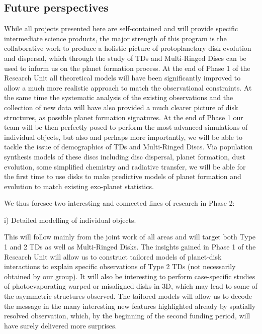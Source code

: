 \documentclass[10pt,fleqn,twoside,a4paper]{article}
\begin{document}
\subsection{Future perspectives}
%
While all projects presented here are self-contained and will
provide specific intermediate science products, the major strength of this program is the collaborative
work to produce a holistic picture of protoplanetary disk evolution
and dispersal, which through the study of TDs and Multi-Ringed Discs can be used
to inform us on the planet formation process. At the end of Phase 1 of
the Research Unit all theoretical models will have been significantly
improved to allow a much more realistic approach to match the
observational constraints. At the same time the systematic analysis of
the existing observations and the collection of new data will have also
provided a much clearer picture of disk structures, as possible planet
formation signatures. At the end of Phase 1 our team will be then
perfectly posed to perform the most advanced simulations of individual
objects, but also and perhaps more importantly, we will be able to
tackle the issue of demographics of TDs and Multi-Ringed Discs. Via population
synthesis models of these discs including disc dispersal, planet formation, dust
evolution, some simplified chemistry and radiative transfer, we will
be able for the first time to use disks to make predictive models of
planet formation and evolution to match existing exo-planet
statistics. 

\begin{highlight}
We thus foresee two interesting and connected lines of research in Phase 2: 
\end{highlight}

\begin{Emphasize}
i) Detailed modelling of individual objects.\\
\end{Emphasize}
This will follow mainly from the joint work of all areas and will
target both Type 1 and 2 TDs as well as Multi-Ringed Disks. The insights gained in
Phase 1 of the Research Unit will allow us to construct tailored
models of planet-disk interactions to explain specific observations of
Type 2 TDs (not necessarily obtained by our group). It will also be
interesting to perform case-specific studies of photoevaporating
warped or misaligned disks in 3D, which may
lead to some of the asymmetric structures observed. The tailored
models will allow us to decode the message in the many interesting new
features highlighted already by spatially resolved observation, which,
by the beginning of the second funding period, will have surely
delivered more surprises.  
\end{document}
